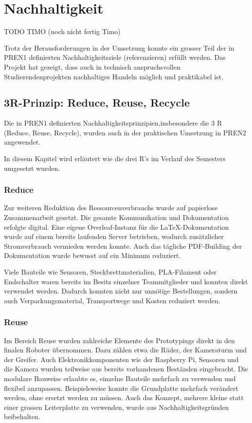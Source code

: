 \section{Nachhaltigkeit}
TODO TIMO (noch nicht fertig Timo)

Trotz der Herausforderungen in der Umsetzung konnte ein grosser Teil der in PREN1  definierten Nachhaltigkeitsziele (referenzieren) erfüllt werden. Das Projekt hat gezeigt, dass auch in technisch anspruchsvollen Studierendenprojekten nachhaltiges Handeln möglich und praktikabel ist.

\subsection{3R-Prinzip: Reduce, Reuse, Recycle}
Die in PREN1 definierten Nachhaltigkeitsprinzipien,insbesondere die 3 R (Reduce, Reuse, Recycle), wurden auch in der praktischen Umsetzung in PREN2 angewendet.  

 In diesem Kapitel wird erläutert wie die drei R's im Verlauf des Semesters umgesetzt wurden.

\subsubsection{Reduce}


Zur weiteren Reduktion des Ressourcenverbrauchs wurde auf papierlose Zusammenarbeit gesetzt. Die gesamte Kommunikation und Dokumentation erfolgte digital. Eine eigene Overleaf-Instanz für die LaTeX-Dokumentation wurde auf einem bereits laufenden Server betrieben, wodurch zusätzlicher Stromverbrauch vermieden werden konnte. Auch das tägliche PDF-Building der Dokumentation wurde bewusst auf ein Minimum reduziert.

Viele Bauteile wie Sensoren, Steckbrettmaterialien, PLA-Filament oder Endschalter waren bereits im Besitz einzelner Teammitglieder und konnten direkt verwendet werden. Dadurch konnten nicht nur unnötige Bestellungen, sondern auch Verpackungsmaterial, Transportwege und Kosten reduziert werden.


\subsubsection{Reuse}

Im Bereich Reuse wurden zahlreiche Elemente des Prototypings direkt in den finalen Roboter übernommen. Dazu zählen etwa die Räder, der Kameraturm und der Greifer. Auch Elektronikkomponenten wie der Raspberry Pi, Sensoren und die Kamera wurden teilweise aus bereits vorhandenen Beständen eingebracht. Die modulare Bauweise erlaubte es, einzelne Bauteile mehrfach zu verwenden und flexibel anzupassen. Beispielsweise konnte die Grundplatte mehrfach verändert werden, ohne ersetzt werden zu müssen. Auch das Konzept, mehrere kleine statt einer grossen Leiterplatte zu verwenden, wurde aus Nachhaltigkeitsgründen beibehalten.



